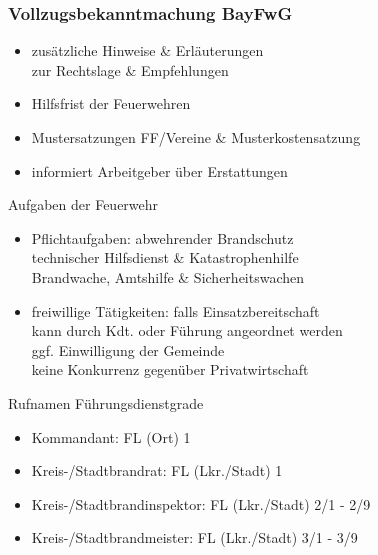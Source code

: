\begin{normbox}{\subsubsection{Vollzugsbekanntmachung BayFwG}}
    \begin{itemize}
        \item zusätzliche Hinweise \& Erläuterungen\\
        \ra zur Rechtslage \& Empfehlungen
        \item Hilfsfrist der Feuerwehren
        \item Mustersatzungen FF/Vereine \& Musterkostensatzung
        \item informiert Arbeitgeber über Erstattungen
    \end{itemize}
\end{normbox}
\begin{sectionbox}{Aufgaben der Feuerwehr}
    \begin{itemize}
        \item Pflichtaufgaben: abwehrender Brandschutz\\
        \ra technischer Hilfsdienst \& Katastrophenhilfe\\
        \ra Brandwache, Amtshilfe \& Sicherheitswachen
        \item freiwillige Tätigkeiten: falls Einsatzbereitschaft\\
        \ra kann durch Kdt. oder Führung angeordnet werden\\
        \ra ggf. Einwilligung der Gemeinde\\
        \ra keine Konkurrenz gegenüber Privatwirtschaft 
    \end{itemize}
\end{sectionbox}
\begin{hintbox}{Rufnamen Führungsdienstgrade}
    \begin{itemize}
        \item Kommandant: FL (Ort) 1
        \item Kreis-/Stadtbrandrat: FL (Lkr./Stadt) 1
        \item Kreis-/Stadtbrandinspektor: FL (Lkr./Stadt) 2/1 - 2/9
        \item  Kreis-/Stadtbrandmeister: FL (Lkr./Stadt) 3/1 - 3/9
    \end{itemize}
\end{hintbox}
